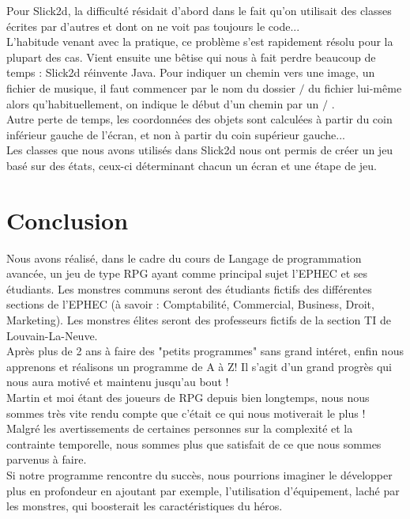 \documentclass[a4paper,titlepage]{article}
\begin{document}
Pour Slick2d, la difficulté résidait d’abord dans le fait qu’on utilisait des classes écrites par d’autres et dont on ne voit pas toujours le code...\\ L’habitude venant avec la pratique, ce problème s’est rapidement résolu pour la plupart des cas. Vient ensuite une bêtise qui nous à fait perdre beaucoup de temps : Slick2d \og réinvente \fg{} Java. Pour indiquer un chemin vers une image, un fichier de musique, il faut commencer par le nom du dossier $/$ du fichier lui-même alors qu'habituellement, on indique le début d’un chemin par un \og $/$ \fg{}. \\

Autre perte de temps, les coordonnées des objets sont calculées à partir du coin inférieur gauche de l’écran, et non à partir du coin supérieur gauche...\\

Les classes que nous avons utilisés dans Slick2d nous ont permis de créer un jeu basé sur des états, ceux-ci déterminant chacun un écran et une étape de jeu.
	\section{Conclusion}
		Nous avons réalisé, dans le cadre du cours de Langage de programmation avancée,  un jeu de type RPG ayant comme principal sujet l'EPHEC et ses étudiants. Les monstres communs seront des étudiants fictifs des différentes sections de l'EPHEC (à savoir : Comptabilité, Commercial, Business, Droit, Marketing). Les monstres élites seront des professeurs fictifs de la section TI de Louvain-La-Neuve.\\
		
	Après plus de 2 ans à faire des "petits programmes" sans grand intéret, enfin nous apprenons et réalisons un programme de A à Z! Il s'agit d'un grand progrès qui nous aura motivé et maintenu jusqu'au bout !\\
	
	Martin et moi étant des joueurs de RPG depuis bien longtemps, nous nous sommes très vite rendu compte que c'était ce qui nous motiverait le plus !\\
	
	Malgré les avertissements de certaines personnes sur la complexité et la contrainte temporelle, nous sommes plus que satisfait de ce que nous sommes parvenus à faire.\\
	
	Si notre programme rencontre du succès, nous pourrions imaginer le développer plus en profondeur en ajoutant par exemple, l'utilisation d'équipement, laché par les monstres, qui boosterait les caractéristiques du héros.\\
\end{document}
